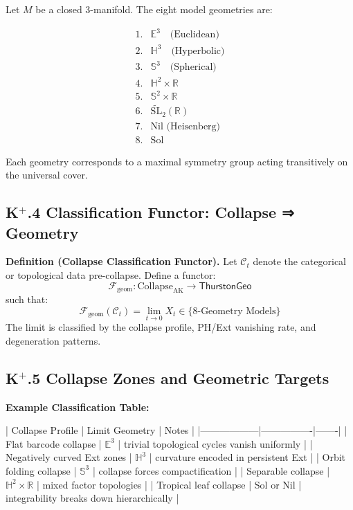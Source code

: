 \documentclass[11pt]{article}
\begin{document}
\begin{axiom}
\begin{axiom}
Let \( M \) be a closed 3-manifold. The eight model geometries are:

\[
\begin{array}{ll}
1. & \mathbb{E}^3 \quad \text{(Euclidean)} \\
2. & \mathbb{H}^3 \quad \text{(Hyperbolic)} \\
3. & \mathbb{S}^3 \quad \text{(Spherical)} \\
4. & \mathbb{H}^2 \times \mathbb{R} \\
5. & \mathbb{S}^2 \times \mathbb{R} \\
6. & \widetilde{\mathrm{SL}}_2(\mathbb{R}) \\
7. & \text{Nil (Heisenberg)} \\
8. & \text{Sol}
\end{array}
\]

Each geometry corresponds to a maximal symmetry group acting transitively on the universal cover.

\subsection*{K$^+$.4 Classification Functor: Collapse ⇒ Geometry}

\textbf{Definition (Collapse Classification Functor).}  
Let \( \mathcal{C}_t \) denote the categorical or topological data pre-collapse.  
Define a functor:
\[
\mathcal{F}_{\mathrm{geom}} : \mathrm{Collapse}_{\mathrm{AK}} \to \mathsf{ThurstonGeo}
\]
such that:
\[
\mathcal{F}_{\mathrm{geom}}(\mathcal{C}_t) = \lim_{t \to 0} X_t \in \{ \text{8-Geometry Models} \}
\]
The limit is classified by the collapse profile, PH/Ext vanishing rate, and degeneration patterns.

\subsection*{K$^+$.5 Collapse Zones and Geometric Targets}

\textbf{Example Classification Table:}

| Collapse Profile | Limit Geometry | Notes |
|------------------|----------------|-------|
| Flat barcode collapse | \( \mathbb{E}^3 \) | trivial topological cycles vanish uniformly |
| Negatively curved Ext zones | \( \mathbb{H}^3 \) | curvature encoded in persistent Ext |
| Orbit folding collapse | \( \mathbb{S}^3 \) | collapse forces compactification |
| Separable collapse | \( \mathbb{H}^2 \times \mathbb{R} \) | mixed factor topologies |
| Tropical leaf collapse | Sol or Nil | integrability breaks down hierarchically |


\end{axiom}
\end{axiom}
\end{document}
